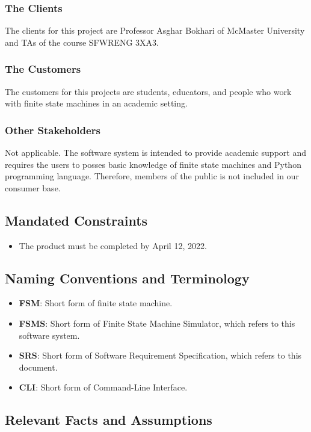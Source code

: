 \documentclass[12pt, titlepage]{article}
\begin{document}
\subsubsection{The Clients}
The clients for this project are Professor Asghar Bokhari of McMaster University
and TAs of the course SFWRENG 3XA3.

\subsubsection{The Customers}
The customers for this projects are students, educators, and people who work
with finite state machines in an academic setting.

\subsubsection{Other Stakeholders}
Not applicable. The software system is intended to provide academic support and
requires the users to posses basic knowledge of finite state machines and Python
programming language. Therefore, members of the public is not included in our
consumer base.

\subsection{Mandated Constraints}
\begin{itemize}
\item The product must be completed by April 12, 2022.
\end{itemize}

\subsection{Naming Conventions and Terminology}
\begin{itemize}
\item \textbf{FSM}: Short form of finite state machine.
\item \textbf{FSMS}: Short form of Finite State Machine Simulator, which refers to this
  software system.
\item \textbf{SRS}: Short form of Software Requirement Specification, which refers to
  this document.
\item \textbf{CLI}: Short form of Command-Line Interface.
\end{itemize}

\subsection{Relevant Facts and Assumptions}
\end{document}
